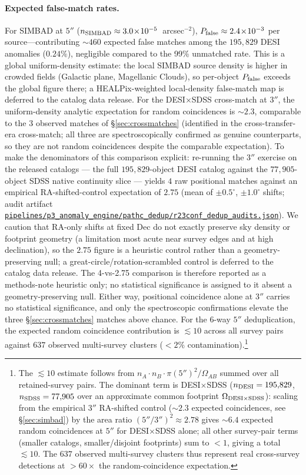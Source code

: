 \documentclass[aps,prd,twocolumn,superscriptaddress,showpacs,preprintnumbers,nofootinbib,longbibliography,floatfix]{revtex4-2}
\newcommand{\repoBase}{https://github.com/Hubify-Projects/bigbounce/blob/main}
\newcommand{\artifact}[1]{\href{\repoBase/#1}{\nolinkurl{#1}}}
\begin{document}
\paragraph{Expected false-match rates.}
For SIMBAD at $5''$ ($n_{\rm SIMBAD} \approx 3.0\!\times\!10^{-5}$~arcsec$^{-2}$), $P_{\rm false} \approx 2.4\!\times\!10^{-3}$ per source---contributing $\sim\!460$ expected false matches among the $195{,}829$ DESI anomalies ($0.24\%$), negligible compared to the 99\% unmatched rate. This is a global uniform-density estimate: the local SIMBAD source density is higher in crowded fields (Galactic plane, Magellanic Clouds), so per-object $P_{\rm false}$ exceeds the global figure there; a HEALPix-weighted local-density false-match map is deferred to the catalog data release. For the DESI$\times$SDSS cross-match at $3''$, the uniform-density analytic expectation for random coincidences is $\sim\!2.3$, comparable to the 3 observed matches of \S\ref{sec:crossmatches} (identified in the cross-transfer-era cross-match; all three are spectroscopically confirmed as genuine counterparts, so they are not random coincidences despite the comparable expectation). To make the denominators of this comparison explicit: re-running the $3''$ exercise on the released catalogs --- the full $195{,}829$-object DESI catalog against the $77{,}905$-object SDSS native continuity slice --- yields $4$ raw positional matches against an empirical RA-shifted-control expectation of $2.75$ (mean of $\pm0.5^\circ$, $\pm1.0^\circ$ shifts; audit artifact \artifact{pipelines/p3\_anomaly\_engine/pathc\_dedup/r23conf\_dedup\_audits.json}). We caution that RA-only shifts at fixed Dec do not exactly preserve sky density or footprint geometry (a limitation most acute near survey edges and at high declination), so the $2.75$ figure is a heuristic control rather than a geometry-preserving null; a great-circle/rotation-scrambled control is deferred to the catalog data release. The 4-vs-2.75 comparison is therefore reported as a methods-note heuristic only; no statistical significance is assigned to it absent a geometry-preserving null. Either way, positional coincidence alone at $3''$ carries no statistical significance, and only the spectroscopic confirmations elevate the three \S\ref{sec:crossmatches} matches above chance. For the 6-way $5''$ deduplication, the expected random coincidence contribution is $\lesssim\!10$ across all survey pairs against $637$ observed multi-survey clusters ($<\!2\%$ contamination).\footnote{The $\lesssim\!10$ estimate follows from $n_A \cdot n_B \cdot \pi(5'')^2/\Omega_{AB}$ summed over all retained-survey pairs. The dominant term is DESI$\times$SDSS ($n_{\rm DESI} = 195{,}829$, $n_{\rm SDSS} = 77{,}905$ over an approximate common footprint $\Omega_{\rm DESI \times SDSS}$): scaling from the empirical $3''$ RA-shifted control (${\sim}2.3$ expected coincidences, see \S\ref{sec:simbad}) by the area ratio $(5''/3'')^2 \approx 2.78$ gives ${\sim}6.4$ expected random coincidences at $5''$ for DESI$\times$SDSS alone; all other survey-pair terms (smaller catalogs, smaller/disjoint footprints) sum to $<\!1$, giving a total $\lesssim\!10$. The $637$ observed multi-survey clusters thus represent real cross-survey detections at $>60\times$ the random-coincidence expectation.}
\end{document}
